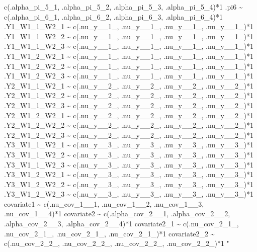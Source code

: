 \documentclass[
]{book}
\newenvironment{Shaded}{\begin{snugshade}}{\end{snugshade}}
\newcommand{\StringTok}[1]{\textcolor[rgb]{0.31,0.60,0.02}{#1}}
\begin{document}
\begin{Shaded}
\begin{Highlighting}[]
\StringTok{    c(.alpha\_pi\_5\_1, .alpha\_pi\_5\_2, .alpha\_pi\_5\_3, .alpha\_pi\_5\_4)*1}
\StringTok{.pi6 \textasciitilde{}}
\StringTok{    c(.alpha\_pi\_6\_1, .alpha\_pi\_6\_2, .alpha\_pi\_6\_3, .alpha\_pi\_6\_4)*1}
\StringTok{.Y1\_W1\_1\_W2\_1 \textasciitilde{}}
\StringTok{    c(.nu\_y\_\_1\_, .nu\_y\_\_1\_, .nu\_y\_\_1\_, .nu\_y\_\_1\_)*1}
\StringTok{.Y1\_W1\_1\_W2\_2 \textasciitilde{}}
\StringTok{    c(.nu\_y\_\_1\_, .nu\_y\_\_1\_, .nu\_y\_\_1\_, .nu\_y\_\_1\_)*1}
\StringTok{.Y1\_W1\_1\_W2\_3 \textasciitilde{}}
\StringTok{    c(.nu\_y\_\_1\_, .nu\_y\_\_1\_, .nu\_y\_\_1\_, .nu\_y\_\_1\_)*1}
\StringTok{.Y1\_W1\_2\_W2\_1 \textasciitilde{}}
\StringTok{    c(.nu\_y\_\_1\_, .nu\_y\_\_1\_, .nu\_y\_\_1\_, .nu\_y\_\_1\_)*1}
\StringTok{.Y1\_W1\_2\_W2\_2 \textasciitilde{}}
\StringTok{    c(.nu\_y\_\_1\_, .nu\_y\_\_1\_, .nu\_y\_\_1\_, .nu\_y\_\_1\_)*1}
\StringTok{.Y1\_W1\_2\_W2\_3 \textasciitilde{}}
\StringTok{    c(.nu\_y\_\_1\_, .nu\_y\_\_1\_, .nu\_y\_\_1\_, .nu\_y\_\_1\_)*1}
\StringTok{.Y2\_W1\_1\_W2\_1 \textasciitilde{}}
\StringTok{    c(.nu\_y\_\_2\_, .nu\_y\_\_2\_, .nu\_y\_\_2\_, .nu\_y\_\_2\_)*1}
\StringTok{.Y2\_W1\_1\_W2\_2 \textasciitilde{}}
\StringTok{    c(.nu\_y\_\_2\_, .nu\_y\_\_2\_, .nu\_y\_\_2\_, .nu\_y\_\_2\_)*1}
\StringTok{.Y2\_W1\_1\_W2\_3 \textasciitilde{}}
\StringTok{    c(.nu\_y\_\_2\_, .nu\_y\_\_2\_, .nu\_y\_\_2\_, .nu\_y\_\_2\_)*1}
\StringTok{.Y2\_W1\_2\_W2\_1 \textasciitilde{}}
\StringTok{    c(.nu\_y\_\_2\_, .nu\_y\_\_2\_, .nu\_y\_\_2\_, .nu\_y\_\_2\_)*1}
\StringTok{.Y2\_W1\_2\_W2\_2 \textasciitilde{}}
\StringTok{    c(.nu\_y\_\_2\_, .nu\_y\_\_2\_, .nu\_y\_\_2\_, .nu\_y\_\_2\_)*1}
\StringTok{.Y2\_W1\_2\_W2\_3 \textasciitilde{}}
\StringTok{    c(.nu\_y\_\_2\_, .nu\_y\_\_2\_, .nu\_y\_\_2\_, .nu\_y\_\_2\_)*1}
\StringTok{.Y3\_W1\_1\_W2\_1 \textasciitilde{}}
\StringTok{    c(.nu\_y\_\_3\_, .nu\_y\_\_3\_, .nu\_y\_\_3\_, .nu\_y\_\_3\_)*1}
\StringTok{.Y3\_W1\_1\_W2\_2 \textasciitilde{}}
\StringTok{    c(.nu\_y\_\_3\_, .nu\_y\_\_3\_, .nu\_y\_\_3\_, .nu\_y\_\_3\_)*1}
\StringTok{.Y3\_W1\_1\_W2\_3 \textasciitilde{}}
\StringTok{    c(.nu\_y\_\_3\_, .nu\_y\_\_3\_, .nu\_y\_\_3\_, .nu\_y\_\_3\_)*1}
\StringTok{.Y3\_W1\_2\_W2\_1 \textasciitilde{}}
\StringTok{    c(.nu\_y\_\_3\_, .nu\_y\_\_3\_, .nu\_y\_\_3\_, .nu\_y\_\_3\_)*1}
\StringTok{.Y3\_W1\_2\_W2\_2 \textasciitilde{}}
\StringTok{    c(.nu\_y\_\_3\_, .nu\_y\_\_3\_, .nu\_y\_\_3\_, .nu\_y\_\_3\_)*1}
\StringTok{.Y3\_W1\_2\_W2\_3 \textasciitilde{}}
\StringTok{    c(.nu\_y\_\_3\_, .nu\_y\_\_3\_, .nu\_y\_\_3\_, .nu\_y\_\_3\_)*1}
\StringTok{covariate1 \textasciitilde{}}
\StringTok{    c(.nu\_cov\_1\_\_1, .nu\_cov\_1\_\_2, .nu\_cov\_1\_\_3, .nu\_cov\_1\_\_4)*1}
\StringTok{covariate2 \textasciitilde{}}
\StringTok{    c(.alpha\_cov\_2\_\_1, .alpha\_cov\_2\_\_2, .alpha\_cov\_2\_\_3, .alpha\_cov\_2\_\_4)*1}
\StringTok{covariate2\_1 \textasciitilde{}}
\StringTok{    c(.nu\_cov\_2\_1\_, .nu\_cov\_2\_1\_, .nu\_cov\_2\_1\_, .nu\_cov\_2\_1\_)*1}
\StringTok{covariate2\_2 \textasciitilde{}}
\StringTok{    c(.nu\_cov\_2\_2\_, .nu\_cov\_2\_2\_, .nu\_cov\_2\_2\_, .nu\_cov\_2\_2\_)*1}
\StringTok{"}


\end{Highlighting}
\end{Shaded}
\end{document}
